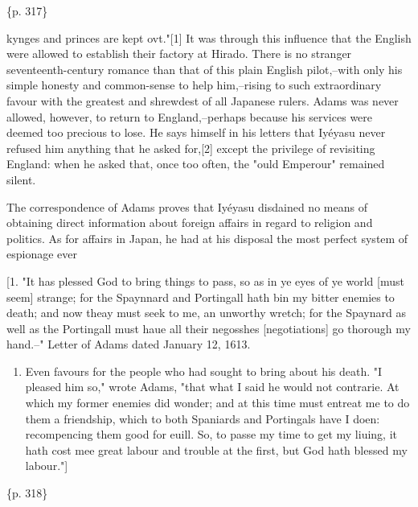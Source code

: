 \{p. 317\}

kynges and princes are kept ovt."[1] It was through this influence that the English were allowed to establish their factory at Hirado. There is no stranger seventeenth-century romance than that of this plain English pilot,--with only his simple honesty and common-sense to help him,--rising to such extraordinary favour with the greatest and shrewdest of all Japanese rulers. Adams was never allowed, however, to return to England,--perhaps because his services were deemed too precious to lose. He says himself in his letters that Iyéyasu never refused him anything that he asked for,[2] except the privilege of revisiting England: when he asked that, once too often, the "ould Emperour" remained silent.



The correspondence of Adams proves that Iyéyasu disdained no means of obtaining direct information about foreign affairs in regard to religion and politics. As for affairs in Japan, he had at his disposal the most perfect system of espionage ever

[1. "It has plessed God to bring things to pass, so as in ye eyes of ye world [must seem] strange; for the Spaynnard and Portingall hath bin my bitter enemies to death; and now theay must seek to me, an unworthy wretch; for the Spaynard as well as the Portingall must haue all their negosshes [negotiations] go thorough my hand.--" Letter of Adams dated January 12, 1613.

\begin{enumerate}
\item Even favours for the people who had sought to bring about his death. "I pleased him so," wrote Adams, "that what I said he would not contrarie. At which my former enemies did wonder; and at this time must entreat me to do them a friendship, which to both Spaniards and Portingals have I doen: recompencing them good for euill. So, to passe my time to get my liuing, it hath cost mee great labour and trouble at the first, but God hath blessed my labour."]
\end{enumerate}

\{p. 318\}

